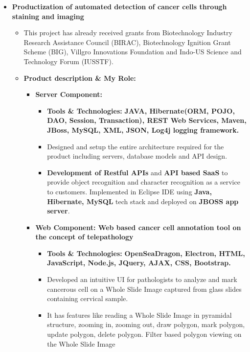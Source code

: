 \documentclass[11pt,letterpaper,sans]{moderncv}        %
\begin{document}
\begin{small}
\begin{itemize}
\item \textbf{Productization of automated detection of cancer cells through staining and imaging}
\vspace{2pt}
\begin{itemize}
\vspace{2pt}
\item This project has already received grants from Biotechnology Industry Research Assistance Council (BIRAC), Biotechnology Ignition Grant Scheme (BIG), Villgro Innovations Foundation and Indo-US Science and Technology Forum (IUSSTF).

\vspace{3pt}

\item \textbf{Product description \& My Role:}
\begin{itemize}
\item \textbf{Server Component:}
\begin{itemize}
\item \textbf{Tools \& Technologies:} \textbf{JAVA, Hibernate(ORM, POJO, DAO, Session, Transaction), REST Web Services, Maven, JBoss, MySQL, XML, JSON, Log4j logging framework.}
\item Designed and setup the entire architecture required for the product including servers, database models and API design.
\vspace{2pt}
\item \textbf{Development of Restful APIs} and \textbf{API based SaaS} to provide object recognition and character recognition as a service to customers. Implemented in Eclipse IDE using \textbf{Java, Hibernate, MySQL} tech stack and deployed on \textbf{JBOSS app server}.
\end{itemize}

\vspace{3pt}

\item \textbf{Web Component: Web based cancer cell annotation tool on the concept of telepathology}
\begin{itemize}
\item \textbf{Tools \& Technologies:} \textbf{OpenSeaDragon, Electron, HTML, JavaScript, Node.js, JQuery, AJAX, CSS, Bootstrap.}
\item Developed an intuitive UI for pathologists to analyze and mark cancerous cell on a Whole Slide Image captured from glass slides containing cervical sample.
\vspace{2pt}
\item It has features like reading a Whole Slide Image in pyramidal structure, zooming in, zooming out, draw polygon, mark polygon, update polygon, delete polygon. Filter based polygon viewing on the Whole Slide Image
\end{itemize}


\end{itemize}
\end{itemize}
\end{itemize}
\end{small}
\end{document}
